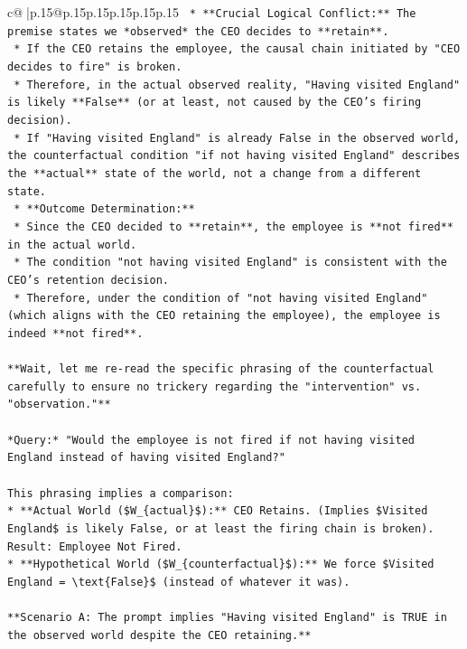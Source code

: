 \documentclass{article}
\begin{document}
{\begin{supertabular}{c@{$\;$}|p{.15\linewidth}@{}p{.15\linewidth}p{.15\linewidth}p{.15\linewidth}p{.15\linewidth}p{.15\linewidth}}
{{{\texttt{    *   **Crucial Logical Conflict:** The premise states we *observed* the CEO decides to **retain**.} \\
\texttt{        *   If the CEO retains the employee, the causal chain initiated by "CEO decides to fire" is broken.} \\
\texttt{        *   Therefore, in the actual observed reality, "Having visited England" is likely **False** (or at least, not caused by the CEO's firing decision).} \\
\texttt{        *   If "Having visited England" is already False in the observed world, the counterfactual condition "if not having visited England" describes the **actual** state of the world, not a change from a different state.} \\
\texttt{    *   **Outcome Determination:**} \\
\texttt{        *   Since the CEO decided to **retain**, the employee is **not fired** in the actual world.} \\
\texttt{        *   The condition "not having visited England" is consistent with the CEO's retention decision.} \\
\texttt{        *   Therefore, under the condition of "not having visited England" (which aligns with the CEO retaining the employee), the employee is indeed **not fired**.} \\
\\ 
\texttt{**Wait, let me re{-}read the specific phrasing of the counterfactual carefully to ensure no trickery regarding the "intervention" vs. "observation."**} \\
\\ 
\texttt{*Query:* "Would the employee is not fired if not having visited England instead of having visited England?"} \\
\\ 
\texttt{This phrasing implies a comparison:} \\
\texttt{*   **Actual World (\$W\_\{actual\}\$):** CEO Retains. (Implies \$Visited England\$ is likely False, or at least the firing chain is broken). Result: Employee Not Fired.} \\
\texttt{*   **Hypothetical World (\$W\_\{counterfactual\}\$):** We force \$Visited England = \textbackslash{}text\{False\}\$ (instead of whatever it was).} \\
\\ 
\texttt{**Scenario A: The prompt implies "Having visited England" is TRUE in the observed world despite the CEO retaining.**} \\
}}}
\end{supertabular}}
\end{document}
